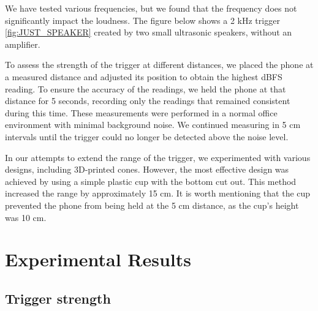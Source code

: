 \documentclass{report}
\theoremstyle{definition}
\theoremstyle{remark}
\begin{document}
We have tested various frequencies, but we found that the frequency does not significantly impact the loudness. The figure below shows a 2 kHz trigger \ref{fig:JUST_SPEAKER} created by two small ultrasonic speakers, without an amplifier. 

To assess the strength of the trigger at different distances, we placed the phone at a measured distance and adjusted its position to obtain the highest dBFS reading. To ensure the accuracy of the readings, we held the phone at that distance for 5 seconds, recording only the readings that remained consistent during this time.  These measurements were performed in a normal office environment with minimal background noise. We continued measuring in 5 cm intervals until the trigger could no longer be detected above the noise level.

In our attempts to extend the range of the trigger, we experimented with various designs, including 3D-printed cones. However, the most effective design was achieved by using a simple plastic cup with the bottom cut out. This method increased the range by approximately 15 cm. It is worth mentioning that the cup prevented the phone from being held at the 5 cm distance, as the cup's height was 10 cm.

\chapter{Experimental Results} 
\label{chap:experimental_results}

\section{Trigger strength}
\end{document}
